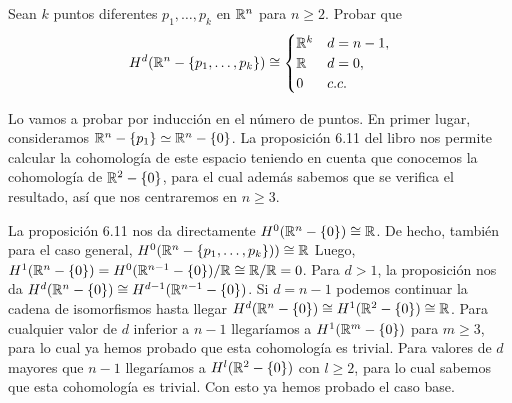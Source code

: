 \documentclass[twoside]{article}
\begin{document}
\begin{ejercicio}{6.3}
Sean $k$ puntos diferentes $p_1,\dots, p_k$  en $\mathbb{R}^n$ para $n\geq 2$. Probar que
\[
H^d(\mathbb{R}^n-\{p_1,\dots, p_k\})\cong\begin{cases}
\mathbb{R}^k & d=n-1,\\
\mathbb{R} & d=0,\\
0 & c.c.
\end{cases}
\]
\end{ejercicio}
\begin{solucion}

Lo vamos a probar por inducción en el número de puntos. En primer lugar, consideramos $\mathbb{R}^n-\{p_1\}\simeq\mathbb{R}^n-\{0\}$. La proposición 6.11 del libro nos permite calcular la cohomología de este espacio teniendo en cuenta que conocemos la cohomología de $\mathbb{R}^2-\{0\}$, para el cual además sabemos que se verifica el resultado, así que nos centraremos en $n\geq 3$. 

La proposición 6.11 nos da directamente $H^0(\mathbb{R}^n-\{0\})\cong\mathbb{R}$. De hecho, también para el caso general, $H^0(\mathbb{R}^n-\{p_1,\dots, p_k\}))\cong\mathbb{R}$ Luego, $H^1(\mathbb{R}^n-\{0\})=H^0(\mathbb{R}^{n-1}-\{0\})/\mathbb{R}\cong \mathbb{R}/\mathbb{R}=0$. Para $d>1$, la proposición nos da $H^d(\mathbb{R}^n-\{0\})\cong H^{d-1}(\mathbb{R}^{n-1}-\{0\})$. Si $d=n-1$ podemos continuar la cadena de isomorfismos hasta llegar $H^d(\mathbb{R}^n-\{0\})\cong  H^{1}(\mathbb{R}^{2}-\{0\})\cong\mathbb{R}$. Para cualquier valor de $d$ inferior a $n-1$ llegaríamos a $H^{1}(\mathbb{R}^{m}-\{0\})$ para $m\geq 3$, para lo cual ya hemos probado que esta cohomología es trivial. Para valores de $d$ mayores que $n-1$ llegaríamos a $H^{l}(\mathbb{R}^{2}-\{0\})$ con $l\geq 2$, para lo cual sabemos que esta cohomología es trivial. Con esto ya hemos probado el caso base. 


\end{solucion}
\end{document}
